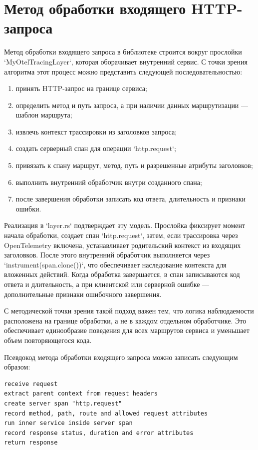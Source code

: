 \section{Метод обработки входящего HTTP-запроса}

Метод обработки входящего запроса в библиотеке строится вокруг прослойки
`MyOtelTracingLayer`, которая оборачивает внутренний сервис. С точки зрения
алгоритма этот процесс можно представить следующей последовательностью:
\begin{enumerate}
    \item принять HTTP-запрос на границе сервиса;
    \item определить метод и путь запроса, а при наличии данных маршрутизации ---
    шаблон маршрута;
    \item извлечь контекст трассировки из заголовков запроса;
    \item создать серверный спан для операции `http.request`;
    \item привязать к спану маршрут, метод, путь и разрешенные атрибуты заголовков;
    \item выполнить внутренний обработчик внутри созданного спана;
    \item после завершения обработки записать код ответа, длительность и признаки ошибки.
\end{enumerate}

Реализация в `layer.rs` подтверждает эту модель. Прослойка фиксирует момент начала
обработки, создает спан `http.request`, затем, если трассировка через
OpenTelemetry включена, устанавливает родительский контекст из входящих заголовков.
После этого внутренний обработчик выполняется через `instrument(span.clone())`,
что обеспечивает наследование контекста для вложенных действий. Когда обработка
завершается, в спан записываются код ответа и длительность, а при клиентской или
серверной ошибке --- дополнительные признаки ошибочного завершения.

С методической точки зрения такой подход важен тем, что логика наблюдаемости
расположена на границе обработки, а не в каждом отдельном обработчике. Это
обеспечивает единообразие поведения для всех маршрутов сервиса и уменьшает объем
повторяющегося кода.

Псевдокод метода обработки входящего запроса можно записать следующим образом:

\begin{verbatim}
receive request
extract parent context from request headers
create server span "http.request"
record method, path, route and allowed request attributes
run inner service inside server span
record response status, duration and error attributes
return response
\end{verbatim}

